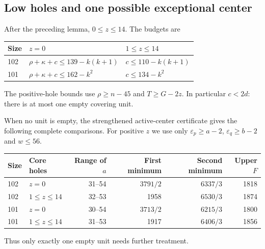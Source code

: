 \documentclass[11pt,a4paper]{article}
\theoremstyle{remark}
\begin{document}
\subsection{Low holes and one possible exceptional center}
After the preceding lemma, $0\leq z\leq14$. The budgets are
\begin{center}\small
\begin{tabular}{lll}
\toprule
Size&$z=0$&$1\leq z\leq14$\\
\midrule
102&$\rho+\kappa+c\leq139-k(k+1)$&$c\leq110-k(k+1)$\\
101&$\rho+\kappa+c\leq162-k^2$&$c\leq134-k^2$\\
\bottomrule
\end{tabular}
\end{center}
The positive-hole bounds use $\rho\geq n-45$ and $T\geq G-2z$.
In particular $c<2d$: there is at most one empty covering unit.

When no unit is empty, the strengthened active-center certificate gives
the following complete comparisons. For positive $z$ we use only
$\varepsilon_p\geq a-2$, $\varepsilon_q\geq b-2$ and $w\leq56$.
\begin{center}\small
\begin{tabular}{llrrrr}
\toprule
Size&Core holes&Range of $a$&First minimum&Second minimum&Upper $F$\\
\midrule
102&$z=0$&31--54&$3791/2$&$6337/3$&1818\\
102&$1\leq z\leq14$&32--53&1958&$6530/3$&1874\\
101&$z=0$&30--54&$3713/2$&$6215/3$&1800\\
101&$1\leq z\leq14$&31--53&1917&$6406/3$&1856\\
\bottomrule
\end{tabular}
\end{center}
Thus only exactly one empty unit needs further treatment.
\end{document}
